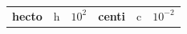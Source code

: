 {\begin{tabular}[t]{|l|l|l|l|l|l|}
    
        
                \textbf{hecto}
               &
    
    
        h &
    
    
        
                \begin{math}{10}^{2}\end{math}
               &
    
    
        
                \textbf{centi}
               &
    
    
        c &
    
    
        
                \begin{math}{10}^{-2}\end{math}
     \tabularnewline\cline{1-1}\cline{2-2}\cline{3-3}\cline{4-4}\cline{5-5}\cline{6-6}
    
    
        

\end{tabular}}

